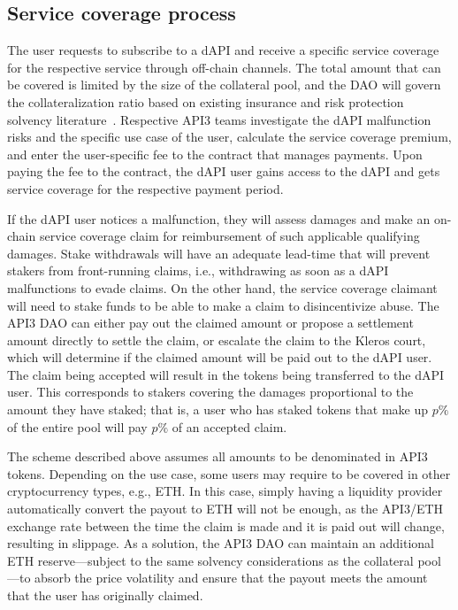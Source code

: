 \documentclass[11pt]{article}
\begin{document}
\subsection{Service coverage process}
\label{sec:service-coverage-process}

The user requests to subscribe to a dAPI and receive a specific service coverage for the respective service through off-chain channels.
The total amount that can be covered is limited by the size of the collateral pool, and the DAO will govern the collateralization ratio based on existing insurance and risk protection solvency literature~\cite{solvency}.
Respective API3 teams investigate the dAPI malfunction risks and the specific use case of the user, calculate the service coverage premium, and enter the user-specific fee to the contract that manages payments.
Upon paying the fee to the contract, the dAPI user gains access to the dAPI and gets service coverage for the respective payment period.

If the dAPI user notices a malfunction, they will assess damages and make an on-chain service coverage claim for reimbursement of such applicable qualifying damages.
Stake withdrawals will have an adequate lead-time that will prevent stakers from front-running claims, i.e., withdrawing as soon as a dAPI malfunctions to evade claims.
On the other hand, the service coverage claimant will need to stake funds to be able to make a claim to disincentivize abuse.
The API3 DAO can either pay out the claimed amount or propose a settlement amount directly to settle the claim, or escalate the claim to the Kleros court, which will determine if the claimed amount will be paid out to the dAPI user.
The claim being accepted will result in the tokens being transferred to the dAPI user.
This corresponds to stakers covering the damages proportional to the amount they have staked; that is, a user who has staked tokens that make up $p\%$ of the entire pool will pay $p\%$ of an accepted claim.

The scheme described above assumes all amounts to be denominated in API3 tokens.
Depending on the use case, some users may require to be covered in other cryptocurrency types, e.g., ETH.
In this case, simply having a liquidity provider automatically convert the payout to ETH will not be enough, as the API3/ETH exchange rate between the time the claim is made and it is paid out will change, resulting in slippage.
As a solution, the API3 DAO can maintain an additional ETH reserve---subject to the same solvency considerations as the collateral pool---to absorb the price volatility and ensure that the payout meets the amount that the user has originally claimed.
\end{document}
